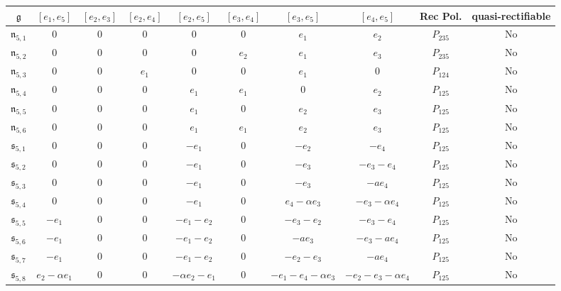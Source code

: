 \documentclass[12pt]{article}
\theoremstyle{plain}
\theoremstyle{definition}
\numberwithin{equation}{section}
\begin{document}
\begin{landscape}

\begin{table}[ht]
   {\small \begin{tabular}{|c|c|c|c|c|c|c|c|c|c|}
         \hline
      $\mathfrak{g}$& $[e_1,e_5]$ & $[e_2,e_3]$&$[e_2,e_4]$&$[e_2,e_5]$&$[e_3,e_4]$&$[e_3,e_5]$& $[e_4,e_5]$&Rec Pol. & quasi-rectifiable\\
 \hline
        $\mathfrak{n}_{5,1}$ & $0$ &$0$&$0$&$0$&$0$ &$e_1$&$e_2$&$P_{235}$& No\\
 \hline
        $\mathfrak{n}_{5,2}$  & $0$ &$0$&$0$&$0$&$e_2$ &$e_1$&$e_3$&$P_{235}$& No\\
 \hline
        $\mathfrak{n}_{5,3}$  & $0$ &$0$&$e_1$&$0$&$0$ &$e_1$&$0$&$P_{124}$& No\\
 \hline
        $\mathfrak{n}_{5,4}$ & $0$ &$0$&$0$&$e_1$&$e_1$ &$0$&$e_2$&$P_{125}$& No\\
   \hline
        $\mathfrak{n}_{5,5}$ & $0$ &$0$&$0$&$e_1$&$0$ &$e_2$&$e_3$&$P_{125}$& No\\
   \hline
        $\mathfrak{n}_{5,6}$  & $0$ &$0$&$0$&$e_1$&$e_1$ &$e_2$&$e_3$&$P_{125}$& No\\
        \hline
             $\mathfrak{s}_{5,1} $  & $0$ &$0$&$0$&$-e_1$&$0$&$-e_2$&$-e_4$&$P_{125}$& No\\
              \hline
             $\mathfrak{s}_{5,2} $  & $0$ &$0$&$0$&$-e_1$&$0$&$-e_3$&$-e_3-e_4$&$P_{125}$& No\\
          \hline
             $\mathfrak{s}_{5,3} $  & $0$ &$0$&$0$&$-e_1$&$0$&$-e_3$&$-ae_4$&$P_{125}$& No\\
          \hline
             $\mathfrak{s}_{5,4} $  & $0$ &$0$&$0$&$-e_1$&$0$&$e_4-\alpha e_3$&$-e_3-\alpha e_4$&$P_{125}$& No\\
          \hline
             $\mathfrak{s}_{5,5} $  & $-e_1$&$0$&0&$-e_1-e_2$&$0$&$-e_3-e_2$&$-e_3-e_4$&$P_{125}$& No\\
          \hline
             $\mathfrak{s}_{5,6} $  & $-e_1$ &$0$&$0$&$-e_1-e_2$&$0$&$-ae_3$&$-e_3-ae_4$&$P_{125}$& No\\
          \hline
             $\mathfrak{s}_{5,7} $ & $-e_1$ &$0$&0&$-e_1-e_2$&$0$&$-e_2-e_3$&$-ae_4$&$P_{125}$& No\\
             \hline
             $\mathfrak{s}_{5,8} $  & $e_2-\alpha e_1$ &$0$&$0$&$-\alpha e_2-e_1$&$0$&$-e_1-e_4-\alpha e_3$&$-e_2-e_3-\alpha e_4$&$P_{125}$& No\\        \hline

\end{tabular}}
\end{table}
\end{landscape}
\end{document}
